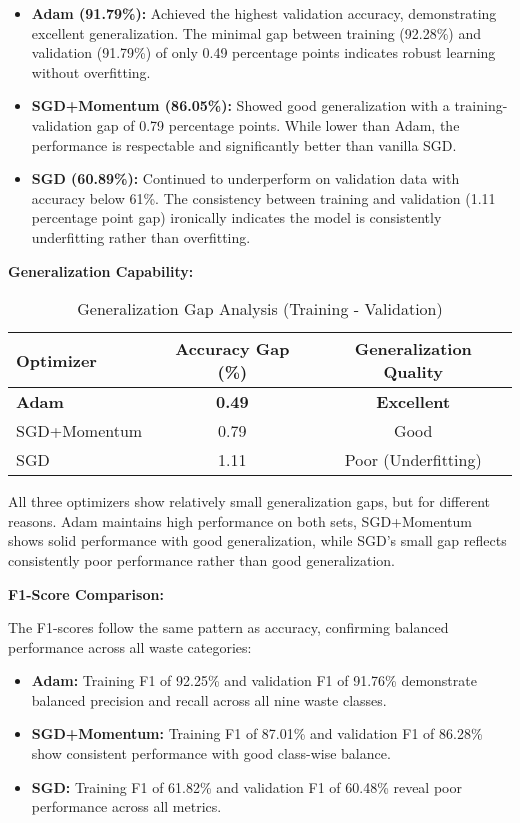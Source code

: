 \documentclass[12pt,a4paper]{article}
\begin{document}
\begin{itemize}
    \item \textbf{Adam (91.79\%):} Achieved the highest validation accuracy, demonstrating excellent generalization. The minimal gap between training (92.28\%) and validation (91.79\%) of only 0.49 percentage points indicates robust learning without overfitting.
    
    \item \textbf{SGD+Momentum (86.05\%):} Showed good generalization with a training-validation gap of 0.79 percentage points. While lower than Adam, the performance is respectable and significantly better than vanilla SGD.
    
    \item \textbf{SGD (60.89\%):} Continued to underperform on validation data with accuracy below 61\%. The consistency between training and validation (1.11 percentage point gap) ironically indicates the model is consistently underfitting rather than overfitting.
\end{itemize}

\textbf{Generalization Capability:}

\begin{table}[H]
\centering
\caption{Generalization Gap Analysis (Training - Validation)}
\begin{tabular}{lcc}
\toprule
\textbf{Optimizer} & \textbf{Accuracy Gap (\%)} & \textbf{Generalization Quality} \\
\midrule
\textbf{Adam} & \textbf{0.49} & \textbf{Excellent} \\
SGD+Momentum & 0.79 & Good \\
SGD & 1.11 & Poor (Underfitting) \\
\bottomrule
\end{tabular}
\end{table}

All three optimizers show relatively small generalization gaps, but for different reasons. Adam maintains high performance on both sets, SGD+Momentum shows solid performance with good generalization, while SGD's small gap reflects consistently poor performance rather than good generalization.

\textbf{F1-Score Comparison:}

The F1-scores follow the same pattern as accuracy, confirming balanced performance across all waste categories:

\begin{itemize}
    \item \textbf{Adam:} Training F1 of 92.25\% and validation F1 of 91.76\% demonstrate balanced precision and recall across all nine waste classes.
    \item \textbf{SGD+Momentum:} Training F1 of 87.01\% and validation F1 of 86.28\% show consistent performance with good class-wise balance.
    \item \textbf{SGD:} Training F1 of 61.82\% and validation F1 of 60.48\% reveal poor performance across all metrics.
\end{itemize}
\end{document}
